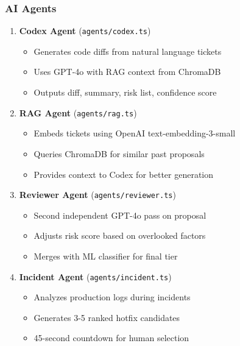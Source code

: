 \documentclass[11pt,a4paper]{article}
\begin{document}
\subsubsection{AI Agents}
\begin{enumerate}
    \item \textbf{Codex Agent} (\texttt{agents/codex.ts})
    \begin{itemize}
        \item Generates code diffs from natural language tickets
        \item Uses GPT-4o with RAG context from ChromaDB
        \item Outputs diff, summary, risk list, confidence score
    \end{itemize}
    
    \item \textbf{RAG Agent} (\texttt{agents/rag.ts})
    \begin{itemize}
        \item Embeds tickets using OpenAI text-embedding-3-small
        \item Queries ChromaDB for similar past proposals
        \item Provides context to Codex for better generation
    \end{itemize}

    \newpage
    \item \textbf{Reviewer Agent} (\texttt{agents/reviewer.ts})
    \begin{itemize}
        \item Second independent GPT-4o pass on proposal
        \item Adjusts risk score based on overlooked factors
        \item Merges with ML classifier for final tier
    \end{itemize}
    
    \item \textbf{Incident Agent} (\texttt{agents/incident.ts})
    \begin{itemize}
        \item Analyzes production logs during incidents
        \item Generates 3-5 ranked hotfix candidates
        \item 45-second countdown for human selection
    \end{itemize}
    

\end{enumerate}
\end{document}
